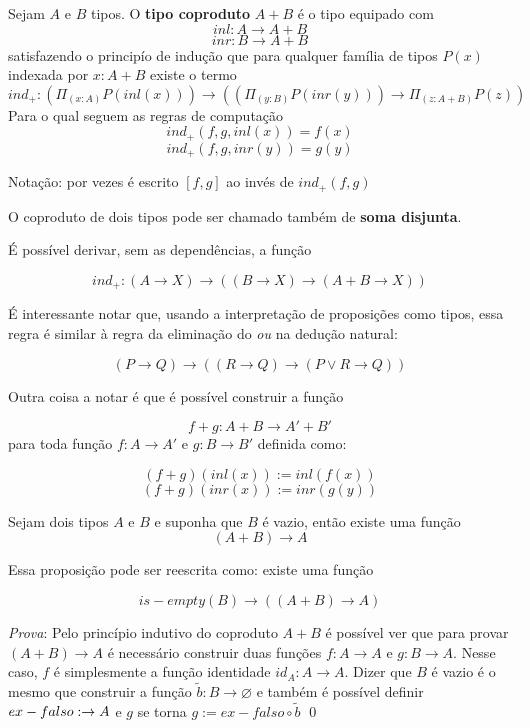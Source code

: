 \documentclass[../main.tex]{subfiles}
\begin{document}
\begin{definition}
    Sejam $A$ e $B$ tipos. O \textbf{tipo coproduto} $A + B$ é o tipo equipado com
    $$inl : A \to A + B$$
    $$inr : B \to A + B$$
    satisfazendo o principío de indução que para qualquer família de tipos $P(x)$ indexada por $x : A + B$ existe o termo
    $$ind_{+} : (\Pi_{(x : A)} P(inl(x))) \to ( (\Pi_{(y : B)} P(inr(y))) \to \Pi_{(z : A + B)} P(z) )$$
    Para o qual seguem as regras de computação
    $$ind_+ (f, g, inl(x)) = f(x)$$
    $$ind_+ (f, g, inr(y)) = g(y)$$
\end{definition}

Notação: por vezes é escrito $[f, g]$ ao invés de $ind_+ (f, g)$

O coproduto de dois tipos pode ser chamado também de \textbf{soma disjunta}.

É possível derivar, sem as dependências, a função

$$ind_+ : (A \to X) \to ((B \to X) \to (A + B \to X))$$

É interessante notar que, usando a interpretação de proposições como tipos, essa regra é similar à regra da eliminação do \emph{ou} na dedução natural:

$$(P \to Q) \to ((R \to Q) \to (P \lor R \to Q))$$

Outra coisa a notar é que é possível construir a função

$$f + g : A + B \to A' + B'$$ para toda função $f : A \to A'$ e $g : B \to B'$ definida como:

$$(f + g)(inl(x)) := inl(f(x))$$
$$(f + g)(inr(x)) := inr(g(y))$$

\begin{proposition}
    Sejam dois tipos $A$ e $B$ e suponha que $B$ é vazio, então existe uma função
    $$(A + B) \to A$$
\end{proposition}

Essa proposição pode ser reescrita como: existe uma função

$$is-empty(B) \to ((A + B) \to A)$$

\emph{Prova}: Pelo princípio indutivo do coproduto $A + B$ é possível ver que para provar $(A + B ) \to A$ é necessário construir duas funções $f : A \to A$ e $g : B \to A$. Nesse caso, $f$ é simplesmente a função identidade $id_A : A \to A$. Dizer que $B$ é vazio é o mesmo que construir a função $\tilde{b} : B \to \varnothing$ e também é possível definir $ex-falso : \empty \to A$ e $g$ se torna $g := ex-falso \circ \tilde{b}$ \qed
\end{document}
